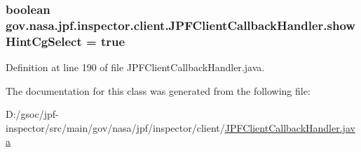 \subsubsection[{\texorpdfstring{show\+Hint\+Cg\+Select}{showHintCgSelect}}]{\setlength{\rightskip}{0pt plus 5cm}boolean gov.\+nasa.\+jpf.\+inspector.\+client.\+J\+P\+F\+Client\+Callback\+Handler.\+show\+Hint\+Cg\+Select = true\hspace{0.3cm}{\ttfamily [private]}}\hypertarget{classgov_1_1nasa_1_1jpf_1_1inspector_1_1client_1_1_j_p_f_client_callback_handler_aa541c0527efe7beb63c26022ed9d9dba}{}\label{classgov_1_1nasa_1_1jpf_1_1inspector_1_1client_1_1_j_p_f_client_callback_handler_aa541c0527efe7beb63c26022ed9d9dba}


Definition at line 190 of file J\+P\+F\+Client\+Callback\+Handler.\+java.



The documentation for this class was generated from the following file\+:\begin{DoxyCompactItemize}
\item 
D\+:/gsoc/jpf-\/inspector/src/main/gov/nasa/jpf/inspector/client/\hyperlink{_j_p_f_client_callback_handler_8java}{J\+P\+F\+Client\+Callback\+Handler.\+java}\end{DoxyCompactItemize}
